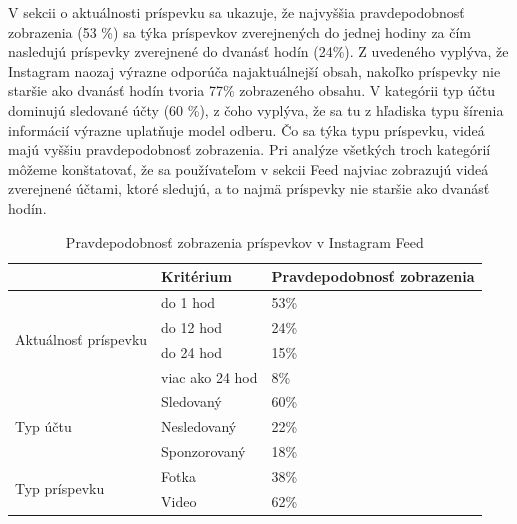 \documentclass[10pt,twoside,slovak,a4paper]{article}
\begin{document}
V sekcii o aktuálnosti príspevku sa ukazuje, že najvyššia pravdepodobnosť zobrazenia (53 \%) sa týka príspevkov zverejnených do jednej hodiny za čím nasledujú príspevky zverejnené do dvanásť hodín (24\%). Z uvedeného vyplýva, že Instagram naozaj výrazne odporúča najaktuálnejší obsah, nakoľko príspevky nie staršie ako dvanásť hodín tvoria 77\% zobrazeného obsahu. V kategórii typ účtu dominujú sledované účty (60 \%), z čoho vyplýva, že sa tu z hľadiska typu šírenia informácií výrazne uplatňuje model odberu. Čo sa týka typu príspevku, videá majú vyššiu pravdepodobnosť zobrazenia. Pri analýze všetkých troch kategórií môžeme konštatovať, že sa používateľom v sekcii Feed najviac zobrazujú videá zverejnené účtami, ktoré sledujú, a to najmä príspevky nie staršie ako dvanásť hodín.

\begin{table}[h]
\begin{tabular}{|l|l|l|}
\hline
&Kritérium                  &Pravdepodobnosť zobrazenia \\
\hline
\multirow{4}{*}{Aktuálnosť príspevku}   	& do 1 hod                  & 53\%    \\ 
                                        				& do 12 hod                & 24\%    \\ 
                                       				 & do 24 hod               & 15\%    \\ 
                                        				& viac ako 24 hod       & 8\%     \\
                                        				\hline
\multirow{3}{*}{Typ účtu}                             & Sledovaný                 & 60\%    \\
                                        			         & Nesledovaný             & 22\%    \\
                                        		                    & Sponzorovaný          & 18\%    \\ 
                                                                          \hline
\multirow{2}{*}{Typ príspevku}                    & Fotka                          & 38\%    \\
                                                                         & Video                          & 62\%    \\ 
                                                                         \hline
\end{tabular}
\caption{Pravdepodobnosť zobrazenia príspevkov v Instagram Feed}
\end{table}
\end{document}
